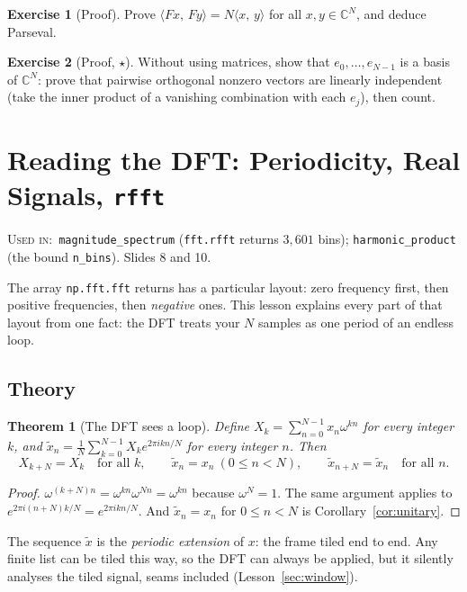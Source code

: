 \documentclass[11pt]{article}
\newtheorem{theorem}{Theorem}[section]
\theoremstyle{definition}
\newtheorem{innerexercise}{Exercise}[section]
\newenvironment{exercise}[1][]{\begin{innerexercise}[#1]}{\end{innerexercise}}
\newcommand{\C}{\mathbb{C}}
\newcommand{\ip}[2]{\langle #1,\, #2\rangle}
\newcommand{\code}[1]{\texttt{#1}}
\newcommand{\usedin}[1]{\par\noindent\colorbox{black!8}{\parbox{\dimexpr\linewidth-2\fboxsep\relax}{\small\textsc{Used in:}~#1}}\par\medskip}
\begin{document}
\begin{exercise}[Proof]\label{ex:parseval}
Prove $\ip{Fx}{Fy}=N\ip xy$ for all $x,y\in\C^N$, and deduce Parseval.
\end{exercise}

\begin{exercise}[Proof, $\star$]\label{ex:basis}
Without using matrices, show that $e_0,\dots,e_{N-1}$ is a basis of $\C^N$: prove that
pairwise orthogonal nonzero vectors are linearly independent (take the inner product of
a vanishing combination with each $e_j$), then count.
\end{exercise}

\section{Reading the DFT: Periodicity, Real Signals, \texttt{rfft}}\label{sec:layout}
\usedin{\code{magnitude\_spectrum} (\code{fft.rfft} returns $3{,}601$ bins);
\code{harmonic\_product} (the bound \code{n\_bins}). Slides 8 and 10.}

The array \code{np.fft.fft} returns has a particular layout: zero frequency first,
then positive frequencies, then \emph{negative} ones. This lesson explains every part
of that layout from one fact: the DFT treats your $N$ samples as one period of an
endless loop.

\subsection{Theory}

\begin{theorem}[The DFT sees a loop]\label{thm:periodic}
Define $X_k=\sum_{n=0}^{N-1}x_n\omega^{kn}$ for \emph{every} integer $k$, and
$\tilde x_n=\frac1N\sum_{k=0}^{N-1}X_k e^{2\pi ikn/N}$ for every integer $n$. Then
\[
X_{k+N}=X_k\quad\text{for all }k,\qquad
\tilde x_n=x_n\ (0\le n<N),\qquad \tilde x_{n+N}=\tilde x_n\quad\text{for all }n.
\]
\end{theorem}
\begin{proof}
$\omega^{(k+N)n}=\omega^{kn}\omega^{Nn}=\omega^{kn}$ because $\omega^N=1$. The same
argument applies to $e^{2\pi i(n+N)k/N}=e^{2\pi ikn/N}$. And $\tilde x_n=x_n$ for
$0\le n<N$ is Corollary~\ref{cor:unitary}.
\end{proof}

The sequence $\tilde x$ is the \emph{periodic extension} of $x$: the frame tiled end to
end. Any finite list can be tiled this way, so the DFT can always be applied, but it
silently analyses the tiled signal, seams included (Lesson~\ref{sec:window}).
\end{document}
